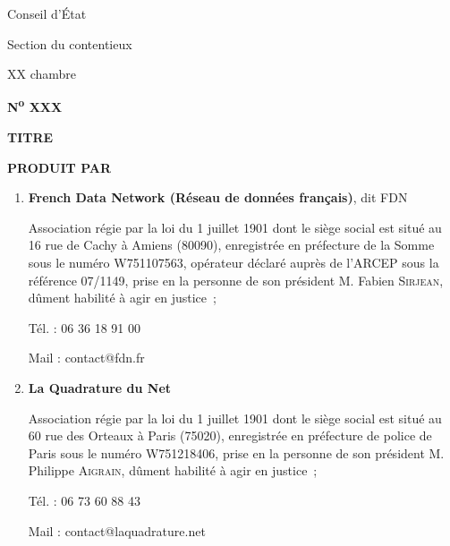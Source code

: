 \begin{titlepage}
\newenvironment{marges}[2]{
\begin{list}{}{\setlength{\leftmargin}{#1}%
\setlength{\rightmargin}{#2}}\item}
{\end{list}}
\pagestyle{empty}
\begin{marges}{-0.6in}{-0.6in}
\begin{minipage}{5cm}\centering
Conseil d'État\par
Section du contentieux\par
XX\ieme{} chambre\par
\textbf{N\textsuperscript{o} XXX}
\end{minipage}
\vskip 1.2cm
\begin{center}\LARGE\bfseries
  TITRE
\end{center}
\vskip 1cm

\textbf{PRODUIT PAR}

\begin{enumerate}
\item \textbf{French Data Network (Réseau de données français)}, dit FDN

Association régie par la loi du 1\ier{} juillet 1901
dont  le  siège  social  est   situé   au 
16 rue de Cachy à Amiens (80090), 
enregistrée en préfecture de la Somme sous le numéro W751107563,
opérateur déclaré auprès de l’ARCEP sous la référence 07/1149,
prise en la personne de son président M. Fabien \textsc{Sirjean}, dûment habilité à agir en justice~;

Tél. : 06 36 18 91 00

Mail : contact@fdn.fr

\item \textbf{La  Quadrature  du  Net}

Association régie par la loi du 1\ier{} juillet 1901
dont  le  siège  social  est   situé   au   
60   rue   des   Orteaux   à   Paris (75020), 
enregistrée en préfecture de police de Paris sous le numéro W751218406,
prise en la personne de 
son président M. Philippe \textsc{Aigrain},
dûment habilité à agir en justice~;

Tél. : 06 73 60 88 43

Mail : contact@laquadrature.net


\end{enumerate}
\end{marges}
\end{titlepage}
